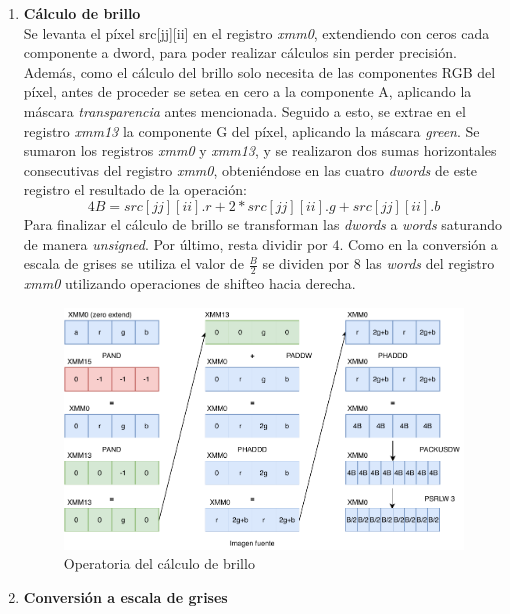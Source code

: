 \documentclass[a4paper]{article}
\begin{document}
\begin{itemize}
 \begin{enumerate}
 	\item \textbf{Cálculo de brillo}\\
 	Se levanta el píxel src[jj][ii] en el registro \textit{xmm0}, extendiendo con ceros cada componente a dword, para poder realizar cálculos sin perder precisión. Además, como el cálculo del  brillo solo necesita de las componentes RGB del píxel, antes de proceder se setea en cero a la componente A, aplicando la máscara \textit{transparencia} antes mencionada. Seguido a esto, se extrae en el registro \textit{xmm13} la componente G del píxel, aplicando la máscara \textit{green}. Se sumaron los registros \textit{xmm0} y \textit{xmm13}, y se realizaron dos sumas horizontales consecutivas del registro \textit{xmm0}, obteniéndose en las cuatro \textit{dwords} de este registro el resultado de la operación:
 	\begin{equation}
 	4B = src[jj][ii].r + 2 * src[jj][ii].g + src[jj][ii].b 
 	\end{equation}
 	Para finalizar el cálculo de brillo se transforman las \textit{dwords} a \textit{words} saturando de manera \textit{unsigned}. Por último, resta dividir por $4$. Como en la conversión a escala de grises se utiliza el valor de $\frac{B}{2}$ se dividen por $8$ las \textit{words} del registro \textit{xmm0} utilizando operaciones de shifteo hacia derecha.
 	
 \begin{figure}[h]
 	\centering
 	\includegraphics[scale = 0.6]{img/ImFan21.pdf}
 	\caption{Operatoria del cálculo de brillo}
 \end{figure}
 
 
 	\item \textbf{Conversión a escala de grises}\\
 	

\end{enumerate}
\end{itemize}
\end{document}
